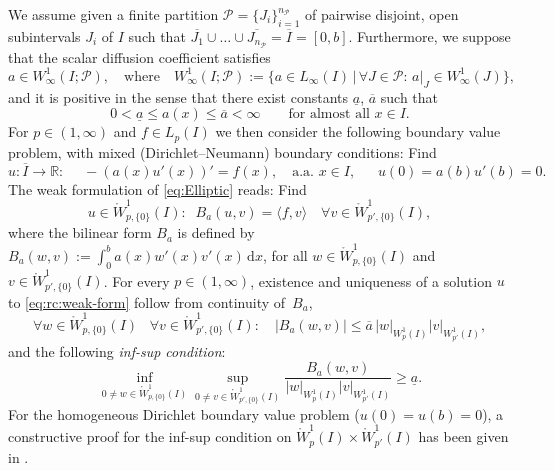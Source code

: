 \documentclass[reqno]{amsart}
\numberwithin{equation}{section}
\newcommand{\bbR}{\mathbb{R}}
\newcommand{\cP}{\mathcal{P}}
\newcommand{\seminorm}[2]{  | #1        |_{ #2 }}
\newcommand{\duality}[1]{     \langle #1       \rangle}
\newcommand{\rd}{\mathrm{d}}
\newcommand{\Wo}{\mathring{W}}
\newcommand{\from}{\colon}
\theoremstyle{remark}
\theoremstyle{definition}
\begin{document}
We assume given a 
finite partition $\cP = \{ J_i \}_{i = 1}^{n_{\cP} }$
of pairwise disjoint, open subintervals $J_i$ of $I$ 
such that 
$\overline{J_1}\cup \ldots \cup \overline{J_{n_\cP}} 
= \overline{I} = [0,b]$. 
Furthermore, 
we suppose that the scalar diffusion coefficient 
satisfies 
%
\[ 
a\in W^1_\infty(I;\cP), 
\quad 
\text{where} 
\quad 
W^1_\infty(I;\cP) 
:= 
\bigl\{ a \in L_{\infty}(I) \, | \, \forall J\in \cP : \, a|_J \in W^1_\infty(J) \bigr\} , 
\] 
%
and it is positive in the sense that there 
exist constants $\underline{a}$, $\overline{a}$ such that 
%
\[
0 < \underline{a} \leq a(x) \leq \overline{a} < \infty 
\qquad 
\text{for almost all }x\in I. 
\]
%
For $p\in(1,\infty)$ and $f\in L_p(I)$  
we then consider the following boundary value problem, 
with mixed (Dirichlet--Neumann) boundary conditions: 
Find  
%
\begin{equation}\label{eq:Elliptic}
u \from \overline{I}\to \bbR: 
\quad\; 
-(a(x)u'(x))' = f(x),  
\quad 
\text{a.a. } x\in I, 
\quad\;\; 
u(0) = a(b)u'(b) = 0.
\end{equation}
%
The weak formulation of \eqref{eq:Elliptic}  
reads: Find 
%
\begin{equation}\label{eq:rc:weak-form}
u\in \Wo^1_{p,\{0\}}(I): 
\;\; 
B_a(u,v) = \duality{ f, v } 
\quad  
\forall v\in \Wo^1_{p'\!,\{0\}}(I), 
\end{equation}
% 
where the bilinear form $B_a$ 
is defined by  
$B_a(w,v) := \int_0^b a(x) w'(x) v'(x) \, \rd x$, 
for all $w\in \Wo^1_{p,\{0\}}(I)$ 
and $v \in \Wo^1_{p'\!,\{0\}}(I)$. 
% 
For every $p\in(1,\infty)$, 
existence and uniqueness of 
a solution $u$ to \eqref{eq:rc:weak-form} 
follow from continuity of~$B_a$, 
%
\begin{equation}\label{eq:Bcont} 
\forall w\in \Wo^1_{p,\{0\}}(I) 
\;\;\; 
\forall v\in \Wo^1_{p'\!,\{0\}}(I) : 
\quad 
|B_a(w,v)| 
\leq 
\overline{a} \, 
\seminorm{ w }{W^1_p(I)} 
\seminorm{ v }{W^1_{p'}(I)}
,
\end{equation}
%
and the following \emph{inf-sup condition}: 
% 
\begin{equation}\label{eq:infsup}
\inf_{0 \neq w \in \Wo^1_{p,\{0\} }(I) } 
\sup_{0\neq v \in \Wo^1_{p'\!,\{0\} }(I) } 
\frac{B_a(w,v)}{ 
	\seminorm{w}{W^1_p(I)} \seminorm{v}{W^1_{p'}(I)} } 
\geq  
\underline{a} . 
\end{equation}
%
For the homogeneous Dirichlet boundary value problem 
($u(0)=u(b)=0$), 
a constructive proof for 
the inf-sup condition 
on $\Wo_p^1(I)\times \Wo^1_{p'}(I)$ 
has been given 
in \cite[Proof of Theorem~3.1]{BabuskaRheinboldt1981}. 
\end{document}
